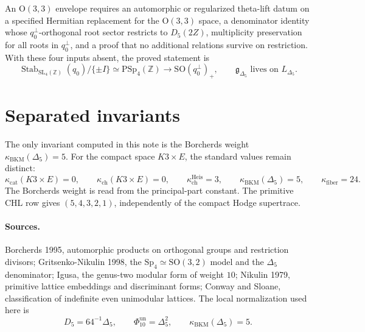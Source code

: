 \documentclass[11pt]{article}
\providecommand{\Z}{\mathbb{Z}}
\providecommand{\OO}{\mathrm{O}}
\providecommand{\SO}{\mathrm{SO}}
\providecommand{\SL}{\mathrm{SL}}
\providecommand{\Sp}{\mathrm{Sp}}
\providecommand{\PSp}{\mathrm{PSp}}
\providecommand{\kBKM}{\kappa_{\mathrm{BKM}}}
\providecommand{\Dfive}{D_5}
\providecommand{\PhiTen}{\Phi_{10}^{\mathrm{un}}}
\theoremstyle{plain}
\theoremstyle{definition}
\begin{document}
An $\OO(3,3)$ envelope requires an automorphic or regularized
theta-lift datum on a specified
Hermitian replacement for the $\OO(3,3)$ space, a denominator identity
whose $q_0^\perp$-orthogonal root sector restricts to $\Dfive(2Z)$,
multiplicity preservation for all roots in $q_0^\perp$, and a proof
that no additional relations survive on restriction.
With these four inputs absent, the proved statement is
\[
\operatorname{Stab}_{\SL_4(\Z)}(q_0)/\{\pm I\}
\simeq \PSp_4(\Z)
\longrightarrow \SO(q_0^\perp)_+,
\qquad
\mathfrak g_{\Delta_5}\text{ lives on }L_{\Delta_5}.
\]

\section{Separated invariants}

The only invariant computed in this note is the Borcherds weight
\(\kBKM(\Delta_5)=5\).  For the compact space $K3\times E$, the
standard values remain distinct:
\[
\kappa_{\mathrm{cat}}(K3\times E)=0,\qquad
\kappa_{\mathrm{ch}}(K3\times E)=0,\qquad
\kappa_{\mathrm{ch}}^{\mathrm{Heis}}=3,\qquad
\kBKM(\Delta_5)=5,\qquad
\kappa_{\mathrm{fiber}}=24.
\]
The Borcherds weight is read from the principal-part constant.  The
primitive CHL row gives \((5,4,3,2,1)\), independently of the compact
Hodge supertrace.

\paragraph{Sources.}
Borcherds 1995, automorphic products on orthogonal groups and
restriction divisors; Gritsenko-Nikulin 1998, the
$\Sp_4\simeq\SO(3,2)$ model and the $\Delta_5$ denominator; Igusa,
the genus-two modular form of weight $10$; Nikulin 1979, primitive
lattice embeddings and discriminant forms; Conway and Sloane,
classification of indefinite even unimodular lattices.  The local
normalization used here is
\[
\Dfive=64^{-1}\Delta_5,\qquad
\PhiTen=\Delta_5^2,\qquad
\kBKM(\Delta_5)=5.
\]
\end{document}
